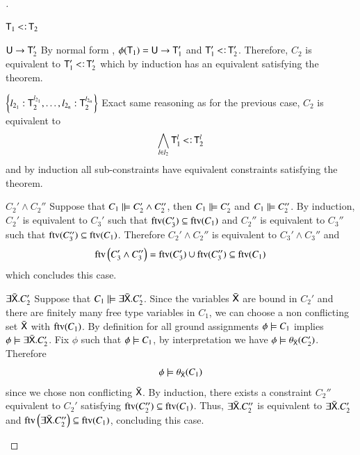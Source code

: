 \documentclass{report}
\begin{document}
\begin{proof}[]
\begin{indcase}{$\type{T}_1\subtype\type{T}_2$}
      \begin{innerindcase}{$\textsf{U}\rightarrow\textsf{T}_2'$}
        By normal form , $\phi(\textsf{T}_1)=\textsf{U}\rightarrow\textsf{T}_1'$ and
        $\type{T}_1'\subtype\type{T}_2'$. Therefore, $C_2$ is equivalent to $\type{T}_1'\subtype\type{T}_2'$
        which by induction has an equivalent satisfying the theorem.
      \end{innerindcase}
      \begin{innerindcase}{$\left\{l_{2_1}:\textsf{T}_2^{l_{2_1}},\ldots,l_{2_n}:\textsf{T}_2^{l_{2_n}}\right\}$}
      	Exact same reasoning as for the previous case, $C_2$ is equivalent to
	    \begin{displaymath}
	      \bigwedge_{l\in l_2} \type{T}_1^l\subtype\type{T}_2^l
	    \end{displaymath}
        and by induction all sub-constraints have equivalent constraints satisfying the theorem.
      \end{innerindcase}
    \end{indcase}
    \begin{indcase}{$C_2'\land C_2''$}
      Suppose that $C_1\mathrel|\models C_2'\land C_2''$, then $C_1\mathrel|\models C_2'$
      and $C_1\mathrel|\models C_2''$. By induction, $C_2'$ is equivalent to $C_3'$
      such that $\mathop{\rm ftv}\nolimits(C_3')\subseteq\mathop{\rm ftv}\nolimits(C_1)$ and $C_2''$ is equivalent to $C_3''$
      such that $\mathop{\rm ftv}\nolimits(C_3'')\subseteq\mathop{\rm ftv}\nolimits(C_1)$. Therefore $C_2'\land C_2''$
      is equivalent to $C_3'\land C_3''$ and
      \begin{displaymath}
        \mathop{\rm ftv}\nolimits\left({C_3'\land C_3''}\right)=\mathop{\rm ftv}\nolimits(C_3')\cup\mathop{\rm ftv}\nolimits(C_3'')\subseteq\mathop{\rm ftv}\nolimits(C_1)
      \end{displaymath}
      which concludes this case.
    \end{indcase}
    \begin{indcase}{$\exists\bar{\textsf{X}}.C_2'$}
      Suppose that $C_1\mathrel|\models\exists\bar{\textsf{X}}.C_2'$.
      Since the variables $\bar{\textsf{X}}$ are bound in $C_2'$ and there are
      finitely many free type variables in $C_1$, we can choose
      a non conflicting set $\bar{\textsf{X}}$ with $\mathop{\rm ftv}\nolimits(C_1)$.
      By definition  for all ground assignments $\phi\models C_1$ implies
      $\phi\models\exists\bar{\textsf{X}}.C_2'$. Fix $\phi$ such that
      $\phi\models C_1$, by interpretation we have $\phi\models\theta_{\bar{\textsf{X}}}(C_2')$.
      Therefore
      \begin{displaymath}
        \phi\models\theta_{\bar{\textsf{X}}}(C_1)
      \end{displaymath}
      since we chose non conflicting $\bar{\textsf{X}}$.
      By induction, there exists a constraint $C_2''$
      equivalent to $C_2'$ satisfying $\mathop{\rm ftv}\nolimits(C_2'')\subseteq\mathop{\rm ftv}\nolimits(C_1)$.
      Thus, $\exists\bar{\textsf{X}}.C_2''$ is equivalent to
      $\exists\bar{\textsf{X}}.C_2'$ and
      $\mathop{\rm ftv}\nolimits\left({\exists\bar{\textsf{X}}.C_2''}\right)\subseteq\mathop{\rm ftv}\nolimits(C_1)$,
      concluding this case.
    \end{indcase}
  \end{proof}
  
\end{document}

